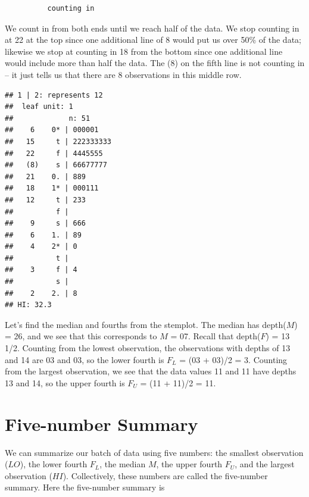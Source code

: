 \documentclass[
]{book}
\newenvironment{Shaded}{\begin{snugshade}}{\end{snugshade}}
\newcommand{\AttributeTok}[1]{\textcolor[rgb]{0.77,0.63,0.00}{#1}}
\newcommand{\ConstantTok}[1]{\textcolor[rgb]{0.00,0.00,0.00}{#1}}
\newcommand{\FunctionTok}[1]{\textcolor[rgb]{0.00,0.00,0.00}{#1}}
\newcommand{\NormalTok}[1]{#1}
\newcommand{\SpecialCharTok}[1]{\textcolor[rgb]{0.00,0.00,0.00}{#1}}
\begin{document}
\begin{verbatim}
          counting in
\end{verbatim}

We count in from both ends until we reach half of the data. We stop counting in at 22 at the top since one additional line of 8 would put us over 50\% of the data; likewise we stop at counting in 18 from the bottom since one additional line would include more than half the data. The (8) on the fifth line is not counting in -- it just tells us that there are 8 observations in this middle row.

\begin{Shaded}
\end{Shaded}

\begin{verbatim}
## 1 | 2: represents 12
##  leaf unit: 1
##             n: 51
##    6    0* | 000001
##   15     t | 222333333
##   22     f | 4445555
##   (8)    s | 66677777
##   21    0. | 889
##   18    1* | 000111
##   12     t | 233
##          f | 
##    9     s | 666
##    6    1. | 89
##    4    2* | 0
##          t | 
##    3     f | 4
##          s | 
##    2    2. | 8
## HI: 32.3
\end{verbatim}

Let's find the median and fourths from the stemplot. The median has depth(\(M\)) = 26, and we see that this corresponds to \(M\) = 07. Recall that depth(\(F\)) = 13 1/2. Counting from the lowest observation, the observations with depths of 13 and 14 are 03 and 03, so the lower fourth is \(F_L\) = (03 + 03)/2 = 3. Counting from the largest observation, we see that the data values 11 and 11 have depths 13 and 14, so the upper fourth is \(F_U\) = (11 + 11)/2 = 11.

\hypertarget{five-number-summary}{%
\section{Five-number Summary}\label{five-number-summary}}

We can summarize our batch of data using five numbers: the smallest observation (\(LO\)), the lower fourth \(F_L\), the median \(M\), the upper fourth \(F_U\), and the largest observation (\(HI\)). Collectively, these numbers are called the five-number summary. Here the five-number summary is
\end{document}
